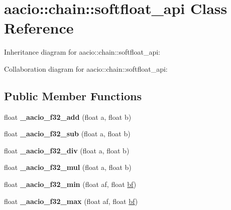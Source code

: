 \hypertarget{classaacio_1_1chain_1_1softfloat__api}{}\section{aacio\+:\+:chain\+:\+:softfloat\+\_\+api Class Reference}
\label{classaacio_1_1chain_1_1softfloat__api}


Inheritance diagram for aacio\+:\+:chain\+:\+:softfloat\+\_\+api\+:


Collaboration diagram for aacio\+:\+:chain\+:\+:softfloat\+\_\+api\+:
\subsection*{Public Member Functions}
\begin{DoxyCompactItemize}
\item 
\mbox{\label{classaacio_1_1chain_1_1softfloat__api_a5f2e0f5922dea0694115e02bba23bfb4}} 
float {\bfseries \+\_\+aacio\+\_\+f32\+\_\+add} (float a, float b)
\item 
\mbox{\label{classaacio_1_1chain_1_1softfloat__api_a898db98695ded65446efed5fcb58c87f}} 
float {\bfseries \+\_\+aacio\+\_\+f32\+\_\+sub} (float a, float b)
\item 
\mbox{\label{classaacio_1_1chain_1_1softfloat__api_a94ccc21422af71890f7d045d548c7ddb}} 
float {\bfseries \+\_\+aacio\+\_\+f32\+\_\+div} (float a, float b)
\item 
\mbox{\label{classaacio_1_1chain_1_1softfloat__api_aef61ac4258836106c5e19c1d403678cc}} 
float {\bfseries \+\_\+aacio\+\_\+f32\+\_\+mul} (float a, float b)
\item 
\mbox{\label{classaacio_1_1chain_1_1softfloat__api_a7dabecc57524b71467a7a9220aad94c4}} 
float {\bfseries \+\_\+aacio\+\_\+f32\+\_\+min} (float af, float \mbox{\hyperlink{structbf}{bf}})
\item 
\mbox{\label{classaacio_1_1chain_1_1softfloat__api_acf14ffec6a2d57ddbd1fcc801af5d57b}} 
float {\bfseries \+\_\+aacio\+\_\+f32\+\_\+max} (float af, float \mbox{\hyperlink{structbf}{bf}})

\end{DoxyCompactItemize}
